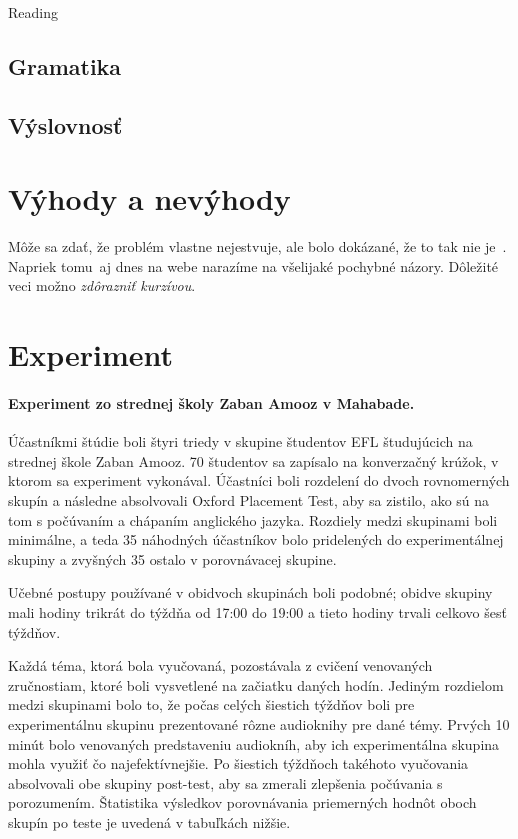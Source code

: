 \documentclass[10pt,oneside,slovak,a4paper]{article}
\begin{document}
Reading

\subsection{Gramatika} \label{mall:gramatika}


\subsection{Výslovnosť} \label{mall:vyslovnost}



\section{Výhody a nevýhody} \label{vyhodyanevyhody}



Môže sa zdať, že problém vlastne nejestvuje\cite{Miangah2012}, ale bolo dokázané, že to tak nie je~\cite{KukulskaHulme2009}. Napriek tomu\, aj dnes na webe narazíme na všelijaké pochybné názory\cite{Kim2012}. Dôležité veci\cite{Azar2014} možno \emph{zdôrazniť kurzívou}.



\section{Experiment} \label{experiment}

\paragraph{Experiment zo strednej školy Zaban Amooz v Mahabade\cite{Azar2014}.} Účastníkmi štúdie boli štyri triedy v skupine študentov EFL študujúcich na strednej škole Zaban Amooz. 70 študentov sa zapísalo na konverzačný krúžok, v ktorom sa experiment vykonával. Účastníci boli rozdelení do dvoch rovnomerných skupín a následne absolvovali Oxford Placement Test, aby sa zistilo, ako sú na tom s počúvaním a chápaním anglického jazyka. Rozdiely medzi skupinami boli minimálne, a teda 35 náhodných účastníkov bolo pridelených do experimentálnej skupiny a zvyšných 35 ostalo v porovnávacej skupine.

Učebné postupy používané v obidvoch skupinách boli podobné; obidve skupiny mali hodiny trikrát do týždňa od 17:00 do 19:00 a tieto hodiny trvali celkovo šesť týždňov.

Každá téma, ktorá bola vyučovaná, pozostávala z cvičení venovaných zručnostiam, ktoré boli vysvetlené na začiatku daných hodín. Jediným rozdielom medzi skupinami bolo to, že počas celých šiestich týždňov boli pre experimentálnu skupinu prezentované rôzne audioknihy pre dané témy. Prvých 10 minút bolo venovaných predstaveniu audiokníh, aby ich experimentálna skupina mohla využiť čo najefektívnejšie. Po šiestich týždňoch takéhoto vyučovania absolvovali obe skupiny post-test, aby sa zmerali zlepšenia počúvania s porozumením. Štatistika výsledkov porovnávania priemerných hodnôt oboch skupín po teste je uvedená v tabuľkách nižšie.\\
\end{document}
